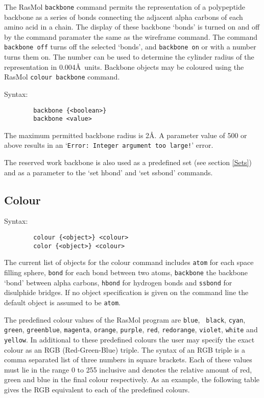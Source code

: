 The RasMol {\tt backbone} command permits the representation of a polypeptide
backbone as a series of bonds connecting the adjacent alpha carbons of each 
amino acid in a chain. The display of these backbone `bonds' is turned on and 
off by the command paramater the same as the wireframe command. The command 
{\tt backbone off} turns off the selected `bonds', and {\tt backbone on} or 
with a number turns them on. The number can be used to determine the cylinder 
radius of the representation in 0.004\AA\ units. Backbone objects may be 
coloured using the RasMol {\tt colour backbone} command.

Syntax:
\begin{verbatim}
        backbone {<boolean>}
        backbone <value>
\end{verbatim}

The maximum permitted backbone radius is 2\AA. A parameter value of 500 or 
above results in an `{\tt Error: Integer argument too large!}' error. 

The reserved work backbone is also used as a predefined set (see section 
\ref{Sets}) and as a parameter to the `set hbond' and `set ssbond' 
commands.


\subsection{Colour}
\label{CColour}

Syntax:
\begin{verbatim}
        colour {<object>} <colour>
        color {<object>} <colour>
\end{verbatim}

The current list of objects for the colour command includes {\tt atom} for
each space filling sphere, {\tt bond} for each bond between two atoms,
{\tt backbone} the backbone `bond' between alpha carbons, {\tt hbond} for
hydrogen bonds and {\tt ssbond} for disulphide bridges. If no object 
specification is given on the command line the default object is assumed 
to be {\tt atom}.

The predefined colour values of the RasMol program are {\tt blue}, {\tt
black}, {\tt cyan}, {\tt green}, {\tt greenblue}, {\tt magenta}, {\tt orange},
{\tt purple}, {\tt red}, {\tt redorange}, {\tt violet}, {\tt white} and
{\tt yellow}. In additional to these predefined colours the user may specify
the exact colour as an RGB (Red-Green-Blue) triple. The syntax of an RGB
triple is a comma separated list of three numbers in square brackets. Each
of these values must lie in the range 0 to 255 inclusive and denotes the
relative amount of red, green and blue in the final colour respectively. As
an example, the following table gives the RGB equivalent to each of the
predefined colours.

